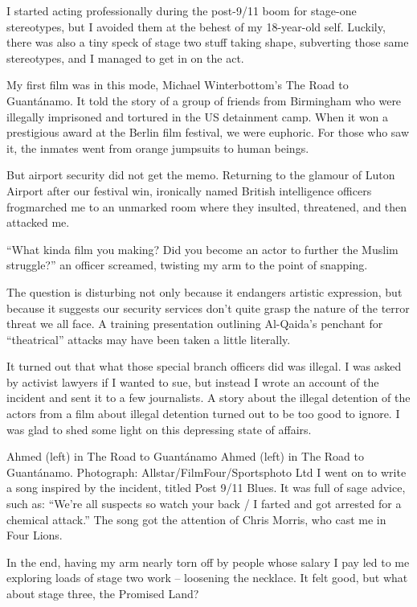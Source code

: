 \documentclass[10pt,a4paper]{article}
\begin{document}
I started acting professionally during the post-9/11 boom for stage-one stereotypes, but I avoided them at the behest of my 18-year-old self. Luckily, there was also a tiny speck of stage two stuff taking shape, subverting those same stereotypes, and I managed to get in on the act.

My first film was in this mode, Michael Winterbottom’s The Road to Guantánamo. It told the story of a group of friends from Birmingham who were illegally imprisoned and tortured in the US detainment camp. When it won a prestigious award at the Berlin film festival, we were euphoric. For those who saw it, the inmates went from orange jumpsuits to human beings.

But airport security did not get the memo. Returning to the glamour of Luton Airport after our festival win, ironically named British intelligence officers frogmarched me to an unmarked room where they insulted, threatened, and then attacked me.

“What kinda film you making? Did you become an actor to further the Muslim struggle?” an officer screamed, twisting my arm to the point of snapping.

The question is disturbing not only because it endangers artistic expression, but because it suggests our security services don’t quite grasp the nature of the terror threat we all face. A training presentation outlining Al-Qaida’s penchant for “theatrical” attacks may have been taken a little literally.

It turned out that what those special branch officers did was illegal. I was asked by activist lawyers if I wanted to sue, but instead I wrote an account of the incident and sent it to a few journalists. A story about the illegal detention of the actors from a film about illegal detention turned out to be too good to ignore. I was glad to shed some light on this depressing state of affairs.

Ahmed (left) in The Road to Guantánamo
Ahmed (left) in The Road to Guantánamo. Photograph: Allstar/FilmFour/Sportsphoto Ltd
I went on to write a song inspired by the incident, titled Post 9/11 Blues. It was full of sage advice, such as: “We’re all suspects so watch your back / I farted and got arrested for a chemical attack.” The song got the attention of Chris Morris, who cast me in Four Lions.

In the end, having my arm nearly torn off by people whose salary I pay led to me exploring loads of stage two work – loosening the necklace. It felt good, but what about stage three, the Promised Land?
\end{document}
